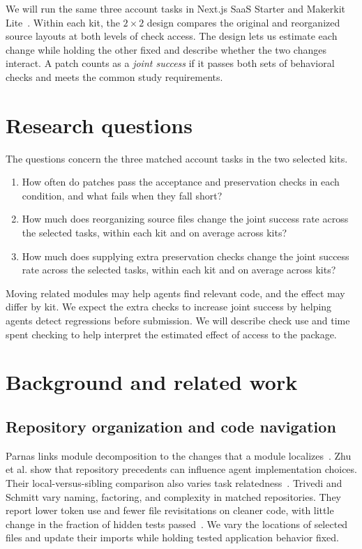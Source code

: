 \documentclass[11pt,a4paper]{article}
\begin{document}
We will run the same three account tasks in Next.js SaaS Starter and Makerkit Lite~\cite{nextjsSaasStarter,makerkitLite}. Within each kit, the $2\times2$ design compares the original and reorganized source layouts at both levels of check access. The design lets us estimate each change while holding the other fixed and describe whether the two changes interact. A patch counts as a \emph{joint success} if it passes both sets of behavioral checks and meets the common study requirements.

\section{Research questions}
The questions concern the three matched account tasks in the two selected kits.
\begin{samepage}
\begin{enumerate}
\item[RQ1.] How often do patches pass the acceptance and preservation checks in each condition, and what fails when they fall short?
\item[RQ2.] How much does reorganizing source files change the joint success rate across the selected tasks, within each kit and on average across kits?
\item[RQ3.] How much does supplying extra preservation checks change the joint success rate across the selected tasks, within each kit and on average across kits?
\end{enumerate}
\end{samepage}

Moving related modules may help agents find relevant code, and the effect may differ by kit. We expect the extra checks to increase joint success by helping agents detect regressions before submission. We will describe check use and time spent checking to help interpret the estimated effect of access to the package.

\section{Background and related work}\label{sec:related-work}
\subsection{Repository organization and code navigation}
Parnas links module decomposition to the changes that a module localizes~\cite{parnas1972modules}. Zhu et al. show that repository precedents can influence agent implementation choices. Their local-versus-sibling comparison also varies task relatedness~\cite{zhu2026precedent}. Trivedi and Schmitt vary naming, factoring, and complexity in matched repositories. They report lower token use and fewer file revisitations on cleaner code, with little change in the fraction of hidden tests passed~\cite{trivedi2026cleanliness}. We vary the locations of selected files and update their imports while holding tested application behavior fixed.
\end{document}
